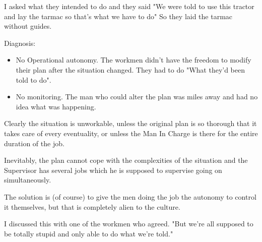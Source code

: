 I asked what they intended to do and they said "We were told to use this tractor and lay the tarmac so that's what we have to do" So they laid the tarmac without guides.

Diagnosis:

\begin{itemize}
  \item No Operational autonomy. The workmen didn't have the freedom to modify their plan after the situation changed. They had to do "What they'd been told to do".

  \item No monitoring. The man who could alter the plan was miles away and had no idea what was happening.

\end{itemize}

Clearly the situation is unworkable, unless the original plan is so thorough that it takes care of every eventuality, or unless the Man In Charge is there for the entire duration of the job.

Inevitably, the plan cannot cope with the complexities of the situation and the Supervisor has several jobs which he is supposed to supervise going on simultaneously.

The solution is (of course) to give the men doing the job the autonomy to control it themselves, but that is completely alien to the culture.

I discussed this with one of the workmen who agreed. "But we're all supposed to be totally stupid and only able to do what we're told."
